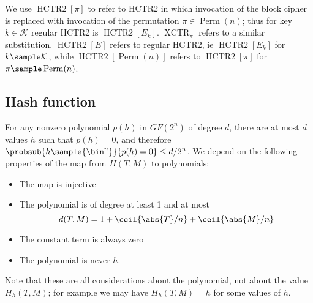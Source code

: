 \documentclass[letterpaper,11pt]{article}
\DeclareMathOperator{\HCTR}{HCTR2}
\DeclareMathOperator{\Perm}{Perm}
\DeclareMathOperator{\XCTR}{XCTR}
\begin{document}
We use \(\HCTR[\pi]\) to refer to HCTR2 in which invocation
of the block cipher is replaced with invocation of the
permutation \(\pi \in \Perm(n)\); thus for key
\(k \in \mathcal{K}\) regular HCTR2 is \(\HCTR[E_k]\).
\(\XCTR_\pi\) refers to a similar substitution.
\(\HCTR[E]\) refers to regular HCTR2,
ie \(\HCTR[E_k]\) for \(k \sample \mathcal{K}\), while
\(\HCTR[\Perm(n)]\) refers to \(\HCTR[\pi]\)
for \(\pi \sample \Perm(n)\).

\subsection{Hash function}\label{hproperties}
For any nonzero polynomial \(p(h)\)
in \(GF(2^n)\) 
of degree \(d\), there are at most \(d\) values \(h\)
such that \(p(h) = 0\), and therefore
\(\probsub{h\sample{\bin^n}}{p(h) = 0} \leq d/2^n\).
We depend on the following properties of the map from 
\(H(T, M)\) to polynomials:
\begin{itemize}
    \item The map is injective
    \item The polynomial is of degree at least 1 and at most
    \begin{displaymath}
        d(T, M) = 1 + \ceil{\abs{T}/n} + \ceil{\abs{M}/n}
    \end{displaymath}
    \item The constant term is always zero
    \item The polynomial is never \(h\).
\end{itemize}
Note that these are all considerations about the polynomial,
not about the value \(H_h(T, M)\);
for example we may have \(H_h(T, M) = h\) for some values of \(h\).
\end{document}
